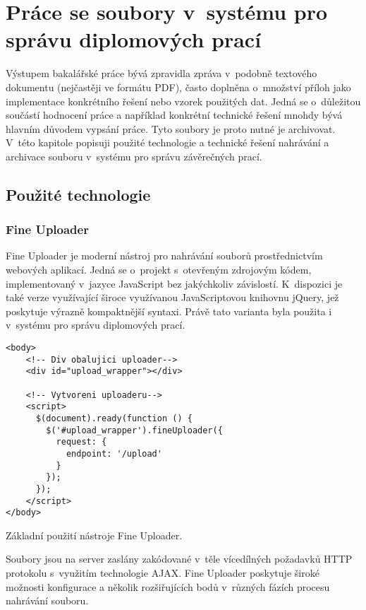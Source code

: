 \chapter{Práce se soubory v~systému pro správu diplomových prací}
Výstupem bakalářské práce bývá zpravidla zpráva v~podobně textového dokumentu (nejčastěji ve formátu PDF), často doplněna o~množství příloh jako implementace konkrétního řešení nebo vzorek použitých dat. Jedná se o~důležitou součástí hodnocení práce a například konkrétní technické řešení mnohdy bývá hlavním důvodem vypsání práce. Tyto soubory je proto nutné je archivovat. V~této kapitole popisuji použité technologie a technické řešení nahrávání a archivace souboru v~systému pro správu závěrečných prací.

\section{Použité technologie}
\subsection{Fine Uploader}
Fine Uploader je moderní nástroj pro nahrávání souborů prostřednictvím webových aplikací. Jedná se o~projekt s~otevřeným zdrojovým kódem, implementovaný v~jazyce JavaScript bez jakýchkoliv závislostí. K~dispozici je také verze využívající široce využívanou JavaScriptovou knihovnu jQuery, jež poskytuje výrazně kompaktnější syntaxi. Právě tato varianta byla použita i v~systému pro správu diplomových prací.
\begin{example}
    \centering
    \begin{lstlisting}
<body>
    <!-- Div obalujici uploader-->
    <div id="upload_wrapper"></div>

    <!-- Vytvoreni uploaderu-->
    <script>
      $(document).ready(function () {
        $('#upload_wrapper').fineUploader({
          request: {
            endpoint: '/upload'
          }
        });
      });
    </script>
</body>
    \end{lstlisting}
    \caption{Základní použití nástroje  Fine Uploader.}
\end{example}
Soubory jsou na server zaslány zakódované v~těle vícedílných požadavků HTTP protokolu s~využitím technologie AJAX. Fine Uploader poskytuje široké možnosti konfigurace a několik rozšiřujících bodů v~různých fázích procesu nahrávání souboru.


